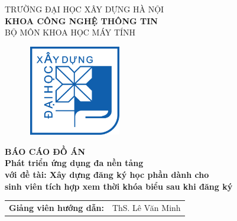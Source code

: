 \documentclass[main.tex]{subfiles}
\begin{document}
\begin{titlepage}

\begin{center}
\vspace{-8pt} {\fontsize{16pt}{0pt}\selectfont TRƯỜNG ĐẠI HỌC XÂY DỰNG HÀ NỘI} \\
\vspace{0.1cm}
\textbf{\fontsize{16pt}{0pt}\selectfont KHOA CÔNG NGHỆ THÔNG TIN}\\
\vspace{0.1cm}
{\fontsize{16pt}{0pt}\selectfont BỘ MÔN KHOA HỌC MÁY TÍNH}\\

\vspace{1cm}
 \begin{figure}[H]
     \centering
     \includegraphics[width=41.56mm, height=39.55mm]{Image/logodhxd.png}
 \end{figure}

\vspace{1cm}
\textbf{\fontsize{25pt}{0pt}\selectfont BÁO CÁO ĐỒ ÁN\\Phát triển ứng dụng đa nền tảng}\\[1cm]
\textbf{\fontsize{20pt}{0pt}\selectfont với đề tài: Xây dựng đăng ký học phần dành cho\\sinh viên tích hợp xem thời khóa biểu sau khi đăng ký}\\[1cm]
\vspace{0.3cm}

\begin{table}[H]
\centering
\begin{tabular}{l l}
{\textbf{\fontsize{16pt}{0pt}\selectfont Giảng viên hướng dẫn:}} & {\fontsize{16pt}{0pt}\selectfont ThS. Lê Văn Minh}\vspace{10pt}\\


\end{tabular}
\end{table}
\end{center}
\end{titlepage}
\end{document}
